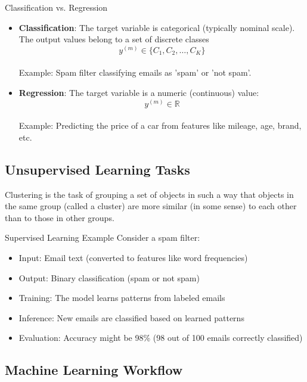 \begin{definition}{Classification vs. Regression}
\begin{itemize}
    \item \textbf{Classification}: The target variable is categorical (typically nominal scale). 
    The output values belong to a set of discrete classes $$y^{(m)} \in \{C_1, C_2, \ldots, C_K\}$$ 
    \\ Example: Spam filter classifying emails as 'spam' or 'not spam'.
    \vspace{-2mm}\\
    \item \textbf{Regression}: The target variable is a numeric (continuous) value: $$y^{(m)} \in \mathbb{R}$$
    \\ Example: Predicting the price of a car from features like mileage, age, brand, etc.
\end{itemize}
\end{definition}

\subsection{Unsupervised Learning Tasks}

\begin{definition}{Clustering}
    is the task of grouping a set of objects in such a way that objects in the same group (called a cluster) are more similar (in some sense) to each other than to
    those in other groups.
\end{definition}

\begin{example2}{Supervised Learning Example}
Consider a spam filter:
\begin{itemize}
    \item Input: Email text (converted to features like word frequencies)
    \item Output: Binary classification (spam or not spam)
    \item Training: The model learns patterns from labeled emails
    \item Inference: New emails are classified based on learned patterns
    \item Evaluation: Accuracy might be 98\% (98 out of 100 emails correctly classified)
\end{itemize}
\end{example2}

\raggedcolumns
\columnbreak

\subsection{Machine Learning Workflow}

